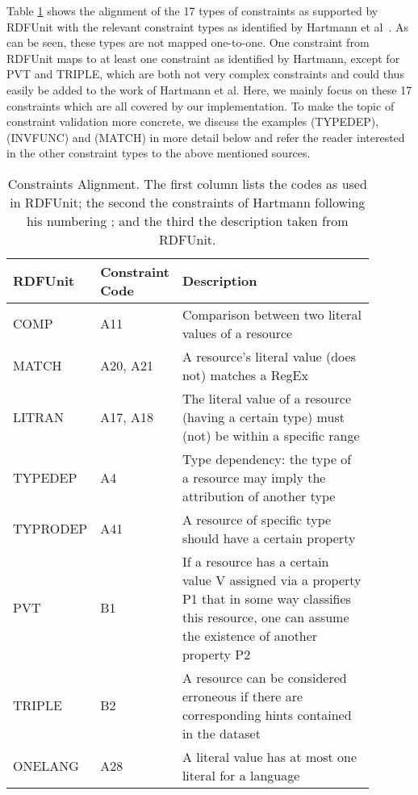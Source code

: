 Table \ref{table:align} shows
the alignment of the 17 types of constraints as supported by RDFUnit
with the relevant constraint types as identified by Hartmann et al~\cite{bosch2015}. 
\sloppy
As can be seen, these types are not mapped one-to-one. 
One constraint from RDFUnit maps to
at least one constraint as identified by Hartmann, 
except for PVT and TRIPLE, which are both not very complex constraints and could thus easily be added to the work of Hartmann et al. 
Here, we mainly focus on these 17 constraints which are all covered by our implementation.
To make the topic of constraint validation more concrete, we discuss the examples (TYPEDEP), (INVFUNC) and (MATCH) in more detail  below
and refer the reader interested  in the other constraint types to the above mentioned sources. 

\begin{table}
\caption{\small Constraints Alignment.
The first column lists the codes as used in RDFUnit;
the second the constraints of Hartmann  following his numbering \cite[appendix]{hartmann2016}; and
the third the description taken from RDFUnit.\normalsize
}
\label{table:align}
\footnotesize
\begin{tabular}{ p{0.2\linewidth} p{0.14\linewidth} p{0.55\linewidth}  } \toprule
\textbf{RDFUnit} & \textbf{Constraint Code} & \textbf{Description} \\ \midrule
COMP & A11  &Comparison between two literal values of a resource\\ \midrule
MATCH & A20, A21 &A resource's literal value (does not) matches a RegEx\\ \midrule
LITRAN & A17, A18 &The literal value of a resource (having a certain type) must (not) be within a specific range\\ \midrule %
TYPEDEP & A4 &Type dependency:  the type of a resource may imply the attribution of another type\\ \midrule %
TYPRODEP & A41 &A resource of specific type should have a certain property\\ \midrule %
PVT & B1 &If a resource has a certain value V assigned via a property P1 that in some way classifies this resource, one can assume the existence of another property P2\\ \midrule %
TRIPLE & B2 &
A resource can be considered erroneous if
there are corresponding hints contained in
the dataset\\ \midrule %
ONELANG & A28 &A literal value has at most one literal for a language\\ \midrule %

\end{tabular}
\end{table}
